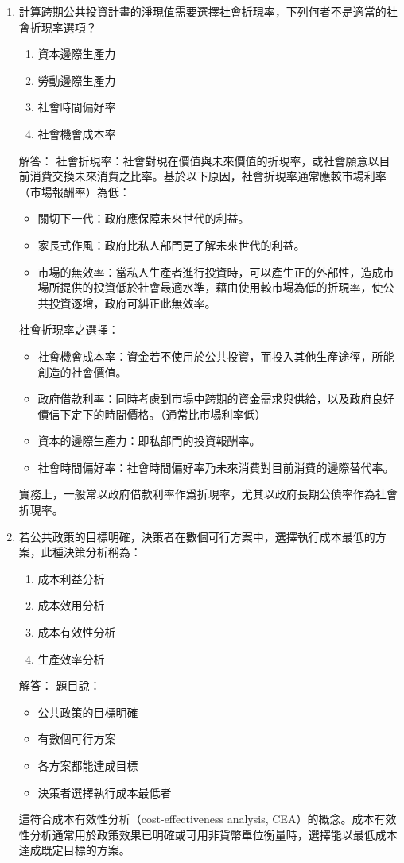 \documentclass[12pt, a4paper]{article}
\begin{document}
\begin{enumerate}
    \item 計算跨期公共投資計畫的淨現值需要選擇社會折現率，下列何者不是適當的社會折現率選項？
    \begin{enumerate}[label=\Alph*.]
        \item 資本邊際生產力
        \item 勞動邊際生產力
        \item 社會時間偏好率
        \item 社會機會成本率
    \end{enumerate}
    解答：
    社會折現率：社會對現在價值與未來價值的折現率，或社會願意以目前消費交換未來消費之比率。基於以下原因，社會折現率通常應較市場利率（市場報酬率）為低：
    \begin{itemize}
        \item 關切下一代：政府應保障未來世代的利益。
        \item 家長式作風：政府比私人部門更了解未來世代的利益。
        \item 市場的無效率：當私人生產者進行投資時，可以產生正的外部性，造成市場所提供的投資低於社會最適水準，藉由使用較市場為低的折現率，使公共投資逐增，政府可糾正此無效率。
    \end{itemize}
    社會折現率之選擇：
    \begin{itemize}
        \item 社會機會成本率：資金若不使用於公共投資，而投入其他生產途徑，所能創造的社會價值。
        \item 政府借款利率：同時考慮到市場中跨期的資金需求與供給，以及政府良好債信下定下的時間價格。（通常比市場利率低）
        \item 資本的邊際生產力：即私部門的投資報酬率。
        \item 社會時間偏好率：社會時間偏好率乃未來消費對目前消費的邊際替代率。
    \end{itemize}
    實務上，一般常以政府借款利率作爲折現率，尤其以政府長期公債率作為社會折現率。

    \item 若公共政策的目標明確，決策者在數個可行方案中，選擇執行成本最低的方案，此種決策分析稱為：
    \begin{enumerate}[label=\Alph*.]
        \item 成本利益分析
        \item 成本效用分析
        \item 成本有效性分析
        \item 生產效率分析
    \end{enumerate}
    解答：
    題目說：
	\begin{itemize}
	    \item 公共政策的目標明確
        \item 有數個可行方案
        \item 各方案都能達成目標
        \item 決策者選擇執行成本最低者
	\end{itemize}
    這符合成本有效性分析（cost-effectiveness analysis, CEA）的概念。成本有效性分析通常用於政策效果已明確或可用非貨幣單位衡量時，選擇能以最低成本達成既定目標的方案。


\end{enumerate}
\end{document}
